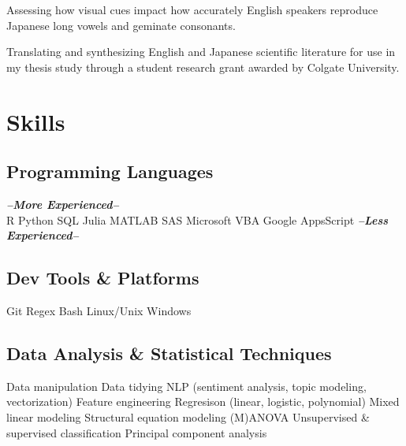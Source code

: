 \documentclass[letterpaper]{deedy-resume_sm} %
\begin{document}
\sectionspace %
\begin{tightitemize}
\item Assessing how visual cues impact how accurately English speakers reproduce Japanese long vowels and geminate consonants.
\end{tightitemize}
\sectionspace %
\begin{tightitemize}
\item Translating and synthesizing English and Japanese scientific literature for use in my thesis study through a student research grant awarded by Colgate University.
\end{tightitemize}
\sectionspace %

\section{Skills}
\subsection{Programming Languages}
{\footnotesize \textit{\textbf{--More Experienced--}}}\\
R \textbullet{} Python \textbullet{} SQL \textbullet{} Julia \textbullet{} MATLAB \textbullet{} SAS \textbullet{} Microsoft VBA \textbullet{} Google AppsScript
{\footnotesize \textit{\textbf{--Less Experienced--}}}\\
\sectionspace
\subsection{Dev Tools \& Platforms}
Git \textbullet{} Regex \textbullet{} Bash \textbullet{} Linux/Unix \textbullet{} Windows
\sectionspace
\subsection{Data Analysis \& Statistical Techniques}
Data manipulation \textbullet{} Data tidying \textbullet{} NLP (sentiment analysis, topic modeling, vectorization) \textbullet{} Feature engineering \textbullet{} Regresison (linear, logistic, polynomial) \textbullet{} Mixed linear modeling \textbullet{} Structural equation modeling \textbullet{} (M)ANOVA \textbullet{} Unsupervised \& supervised classification \textbullet{} Principal component analysis\\
\sectionspace
\end{document}
